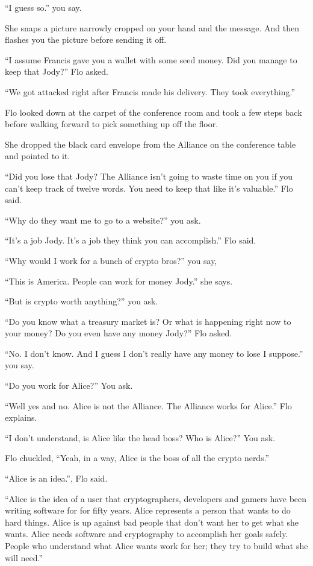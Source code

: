 \documentclass[17pt, twoside, a5paper, openright, extrafontsizes]{memoir}
\begin{document}
``I guess so.'' you say.

She snaps a picture narrowly cropped on your hand and the message. And
then flashes you the picture before sending it off.

``I assume Francis gave you a wallet with some seed money. Did you
manage to keep that Jody?'' Flo asked.

``We got attacked right after Francis made his delivery. They took
everything.''

Flo looked down at the carpet of the conference room and took a few
steps back before walking forward to pick something up off the floor.

She dropped the black card envelope from the Alliance on the conference
table and pointed to it.

``Did you lose that Jody? The Alliance isn't going to waste time on you
if you can't keep track of twelve words. You need to keep that like it's
valuable.'' Flo said.

``Why do they want me to go to a website?'' you ask.

``It's a job Jody. It's a job they think you can accomplish.'' Flo said.

``Why would I work for a bunch of crypto bros?'' you say,

``This is America. People can work for money Jody.'' she says.

``But is crypto worth anything?'' you ask.

``Do you know what a treasury market is? Or what is happening right now
to your money? Do you even have any money Jody?'' Flo asked.

``No. I don't know. And I guess I don't really have any money to lose I
suppose.'' you say.

``Do you work for Alice?'' You ask.

``Well yes and no. Alice is not the Alliance. The Alliance works for
Alice.'' Flo explains.

``I don't understand, is Alice like the head boss? Who is Alice?'' You
ask.

Flo chuckled, ``Yeah, in a way, Alice is the boss of all the crypto
nerds.''

``Alice is an idea.'', Flo said.

``Alice is the idea of a user that cryptographers, developers and gamers
have been writing software for for fifty years. Alice represents a
person that wants to do hard things. Alice is up against bad people that
don't want her to get what she wants. Alice needs software and
cryptography to accomplish her goals safely. People who understand what
Alice wants work for her; they try to build what she will need.''
\end{document}
